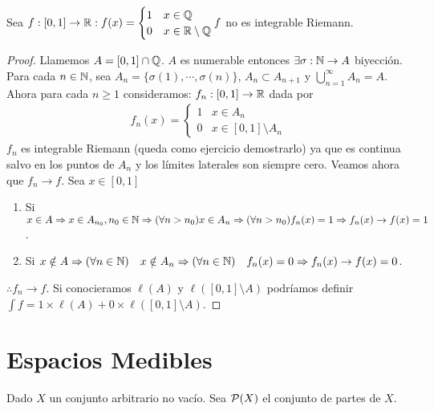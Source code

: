 \begin{eg}
    Sea $f: [0, 1] \to \mathbb{R} : f(x) = \begin{cases}
            1 & x \in \mathbb{Q}              \\
            0 & x \in \mathbb{R} \setminus \mathbb{Q}
        \end{cases} f$ no es integrable Riemann.
    \begin{proof}
        Llamemos $A = [0, 1] \cap \mathbb{Q}$. $A$ es numerable entonces $\exists \sigma: \mathbb{N} \to A$ biyección. Para cada $n \in \mathbb{N}$, sea
        $A_n = \{ \sigma(1), \cdots, \sigma(n) \}$, $A_n \subset A_{n+1}$ y $\bigcup_{n=1}^{\infty} A_n = A$.
        Ahora para cada $n \geq 1$ consideramos:
        $f_n: [0, 1] \to \mathbb{R}$ dada por
        \begin{align*}
            f_n(x) = \begin{cases}
                         1 & x \in A_n                  \\
                         0 & x \in [0, 1] \setminus A_n
                     \end{cases}
        \end{align*}
        $f_n$ es integrable Riemann (queda como ejercicio demostrarlo) ya que es continua salvo en los puntos de $A_n$ y
        los límites laterales son siempre cero.
        Veamos ahora que $f_n \to f$. Sea $x \in [0, 1]$ \begin{enumerate}
            \item Si $x \in A \Rightarrow x \in A_{n_0}, n_0 \in \mathbb{N} \Rightarrow (\forall n > n_0) x \in A_n \Rightarrow (\forall n > n_0) f_n(x) = 1 \Rightarrow f_n(x) \to f(x) = 1$.
            \item Si $x \notin A \Rightarrow (\forall n \in \mathbb{N}) \quad x \notin A_n \Rightarrow (\forall n \in \mathbb{N}) \quad f_n(x) = 0 \Rightarrow f_n(x) \to f(x) = 0$.
        \end{enumerate} $\therefore f_n \to f$.
        Si conocieramos $\ell(A)$ y $\ell([0, 1] \setminus A)$ podríamos definir $\int f = 1 \times \ell(A) + 0 \times \ell([0, 1] \setminus A)$.
    \end{proof}
\end{eg}

\section{Espacios Medibles}

Dado $X$ un conjunto arbitrario no vacío. Sea $\mathcal{P}(X)$ el conjunto de partes de $X$.

